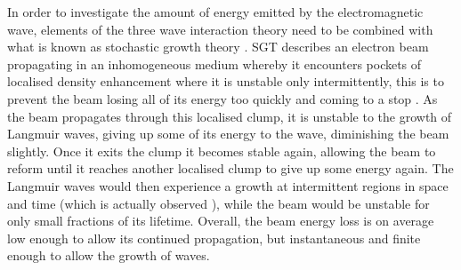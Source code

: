 %
%

In order to investigate the amount of energy emitted by the electromagnetic wave, elements of the three wave interaction theory need to be combined with what is known as stochastic growth theory \citep[SGT;][]{robinson1993a}. 
SGT describes an electron beam propagating in an inhomogeneous medium whereby it encounters pockets of localised density enhancement where it is unstable only intermittently, this is to prevent the beam losing all of its energy too quickly and coming to a stop \citep{sturrock1964, ginzburg1958}. As the beam propagates through this localised clump, it is unstable to the growth of Langmuir waves, giving up some of its energy to the wave, diminishing the beam slightly. Once it exits the clump it becomes stable again, allowing the beam to reform until it reaches another localised clump to give up some energy again. The Langmuir waves would then experience a growth at intermittent regions in space and time (which is actually observed \citep{lin1986}), while the beam would be unstable for only small fractions of its lifetime. Overall, the beam energy loss is on average low enough to allow its continued propagation, but instantaneous and finite enough to allow the growth of waves. 
